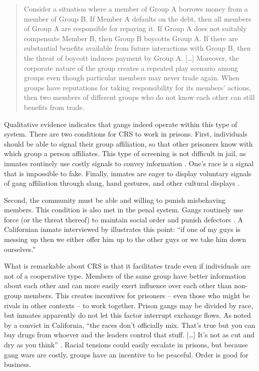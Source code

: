 \documentclass[a4paper, 12pt]{article}
\begin{document}
\begin{quote}
Consider a situation where a member of Group A borrows money from a member of Group B. If Member A defaults on the debt, then all members of Group A are responsible for repaying it. If Group A does not suitably compensate Member B, then Group B boycotts Group A. If there are substantial benefits available from future interactions with Group B, then the threat of boycott induces payment by Group A. [\dots] Moreover, the corporate nature of the group creates a repeated play scenario among groups even though particular members may never trade again. When groups have reputations for taking responsibility for its members' actions, then two members of different groups who do not know each other can still benefits from trade. \citep[p. 226]{roth2014prison}
\end{quote}

Qualitative evidence indicates that gangs indeed operate within this type of system. There are two conditions for CRS to work in prisons. First, individuals should be able to signal their group affiliation, so that other prisoners know with which group a person affiliates. This type of screening is not difficult in jail, as inmates routinely use costly signals to convey information \citep{gambetta2009codes}. One's race is a signal that is impossible to fake. Finally, inmates are eager to display voluntary signals of gang affiliation through slang, hand gestures, and other cultural displays \citep{kaminski2010games,valentine2000gangs}.

Second, the community must be able and willing to punish misbehaving members. This condition is also met in the penal system. Gangs routinely use force (or the threat thereof) to maintain social order and punish defectors \citep{skarbek2011governance,skarbek2012prison,skarbek2014social}. A Californian inmate interviewed by \citet[p. 763]{trammell2009values} illustrates this point: ``if one of my guys is messing up then we either offer him up to the other guys or we take him down ourselves.'' 

What is remarkable about CRS is that it facilitates trade even if individuals are not of a cooperative type. Members of the same group have better information about each other and can more easily exert influence over each  other than non-group members. This creates incentives for prisoners -- even those who might be rivals in other contexts -- to work together. Prison gangs may be divided by race, but inmates apparently do not let this factor interrupt exchange flows. As noted by a convict in California, ``the races don't officially mix. That's true but you can buy drugs from whoever and the leaders control that stuff. [\dots] It's not as cut and dry as you think'' \citep[p. 756]{trammell2009values}. Racial tensions could easily escalate in prisons, but because gang wars are costly, groups have an incentive to be peaceful. Order is good for business.
\end{document}
